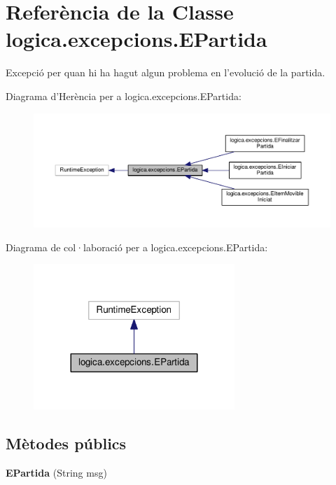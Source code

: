 \hypertarget{classlogica_1_1excepcions_1_1_e_partida}{\section{Referència de la Classe logica.\+excepcions.\+E\+Partida}
\label{classlogica_1_1excepcions_1_1_e_partida}
}


Excepció per quan hi ha hagut algun problema en l'evolució de la partida.  




Diagrama d'Herència per a logica.\+excepcions.\+E\+Partida\+:\nopagebreak
\begin{figure}[H]
\begin{center}
\leavevmode
\includegraphics[width=350pt]{classlogica_1_1excepcions_1_1_e_partida__inherit__graph}
\end{center}
\end{figure}


Diagrama de col·laboració per a logica.\+excepcions.\+E\+Partida\+:\nopagebreak
\begin{figure}[H]
\begin{center}
\leavevmode
\includegraphics[width=215pt]{classlogica_1_1excepcions_1_1_e_partida__coll__graph}
\end{center}
\end{figure}
\subsection*{Mètodes públics}
\begin{DoxyCompactItemize}
\item 
\hypertarget{classlogica_1_1excepcions_1_1_e_partida_a780291d9826138a6442e26774cf82aa1}{{\bfseries E\+Partida} (String msg)}\label{classlogica_1_1excepcions_1_1_e_partida_a780291d9826138a6442e26774cf82aa1}

\end{DoxyCompactItemize}


